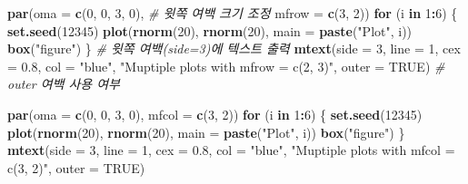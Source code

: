 \documentclass[
  11pt,
]{krantz}
\newenvironment{Shaded}{\begin{snugshade}}{\end{snugshade}}
\newcommand{\CommentTok}[1]{\textcolor[rgb]{0.37,0.37,0.37}{\textit{#1}}}
\newcommand{\ControlFlowTok}[1]{\textcolor[rgb]{0.27,0.27,0.27}{\textbf{#1}}}
\newcommand{\DataTypeTok}[1]{\textcolor[rgb]{0.27,0.27,0.27}{#1}}
\newcommand{\DecValTok}[1]{\textcolor[rgb]{0.06,0.06,0.06}{#1}}
\newcommand{\FloatTok}[1]{\textcolor[rgb]{0.06,0.06,0.06}{#1}}
\newcommand{\KeywordTok}[1]{\textcolor[rgb]{0.27,0.27,0.27}{\textbf{#1}}}
\newcommand{\NormalTok}[1]{#1}
\newcommand{\OperatorTok}[1]{\textcolor[rgb]{0.43,0.43,0.43}{\textbf{#1}}}
\newcommand{\OtherTok}[1]{\textcolor[rgb]{0.37,0.37,0.37}{#1}}
\newcommand{\StringTok}[1]{\textcolor[rgb]{0.5,0.5,0.5}{#1}}
\begin{document}
\begin{Shaded}
\begin{Highlighting}[]
\KeywordTok{par}\NormalTok{(}\DataTypeTok{oma =} \KeywordTok{c}\NormalTok{(}\DecValTok{0}\NormalTok{, }\DecValTok{0}\NormalTok{, }\DecValTok{3}\NormalTok{, }\DecValTok{0}\NormalTok{), }\CommentTok{# 윗쪽 여백 크기 조정}
    \DataTypeTok{mfrow =} \KeywordTok{c}\NormalTok{(}\DecValTok{3}\NormalTok{, }\DecValTok{2}\NormalTok{))}
\ControlFlowTok{for}\NormalTok{ (i }\ControlFlowTok{in} \DecValTok{1}\OperatorTok{:}\DecValTok{6}\NormalTok{) \{}
  \KeywordTok{set.seed}\NormalTok{(}\DecValTok{12345}\NormalTok{)}
  \KeywordTok{plot}\NormalTok{(}\KeywordTok{rnorm}\NormalTok{(}\DecValTok{20}\NormalTok{), }\KeywordTok{rnorm}\NormalTok{(}\DecValTok{20}\NormalTok{),}
       \DataTypeTok{main =} \KeywordTok{paste}\NormalTok{(}\StringTok{"Plot"}\NormalTok{, i))}
  \KeywordTok{box}\NormalTok{(}\StringTok{"figure"}\NormalTok{)}
\NormalTok{\}}
\CommentTok{# 윗쪽 여백(side=3)에 텍스트 출력}
\KeywordTok{mtext}\NormalTok{(}\DataTypeTok{side =} \DecValTok{3}\NormalTok{, }\DataTypeTok{line =} \DecValTok{1}\NormalTok{, }\DataTypeTok{cex =} \FloatTok{0.8}\NormalTok{, }\DataTypeTok{col =} \StringTok{"blue"}\NormalTok{,}
    \StringTok{"Muptiple plots with mfrow = c(2, 3)"}\NormalTok{,}
    \DataTypeTok{outer =} \OtherTok{TRUE}\NormalTok{) }\CommentTok{# outer 여백 사용 여부}

\KeywordTok{par}\NormalTok{(}\DataTypeTok{oma =} \KeywordTok{c}\NormalTok{(}\DecValTok{0}\NormalTok{, }\DecValTok{0}\NormalTok{, }\DecValTok{3}\NormalTok{, }\DecValTok{0}\NormalTok{),}
    \DataTypeTok{mfcol =} \KeywordTok{c}\NormalTok{(}\DecValTok{3}\NormalTok{, }\DecValTok{2}\NormalTok{))}
\ControlFlowTok{for}\NormalTok{ (i }\ControlFlowTok{in} \DecValTok{1}\OperatorTok{:}\DecValTok{6}\NormalTok{) \{}
  \KeywordTok{set.seed}\NormalTok{(}\DecValTok{12345}\NormalTok{)}
  \KeywordTok{plot}\NormalTok{(}\KeywordTok{rnorm}\NormalTok{(}\DecValTok{20}\NormalTok{), }\KeywordTok{rnorm}\NormalTok{(}\DecValTok{20}\NormalTok{),}
       \DataTypeTok{main =} \KeywordTok{paste}\NormalTok{(}\StringTok{"Plot"}\NormalTok{, i))}
  \KeywordTok{box}\NormalTok{(}\StringTok{"figure"}\NormalTok{)}
\NormalTok{\}}
\KeywordTok{mtext}\NormalTok{(}\DataTypeTok{side =} \DecValTok{3}\NormalTok{, }\DataTypeTok{line =} \DecValTok{1}\NormalTok{, }\DataTypeTok{cex =} \FloatTok{0.8}\NormalTok{, }\DataTypeTok{col =} \StringTok{"blue"}\NormalTok{,}
    \StringTok{"Muptiple plots with mfcol = c(3, 2)"}\NormalTok{,}
    \DataTypeTok{outer =} \OtherTok{TRUE}\NormalTok{)}
\end{Highlighting}
\end{Shaded}
\end{document}
